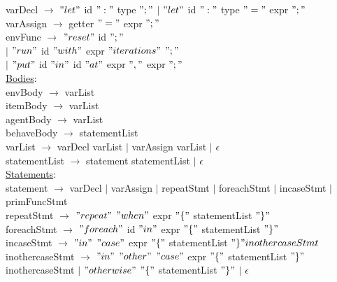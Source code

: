 \documentclass{article}
\begin{document}
varDecl $\rightarrow$ $"let"$ id $":"$ type $";"$ $\vert$ $"let"$ id $":"$ type $"="$ expr $";"$ \\

varAssign $\rightarrow$ getter $"="$ expr $";"$ \\

envFunc $\rightarrow$ $"reset"$ id $";"$ \\
$\vert$ $"run"$ id $"with"$ expr $"iterations"$ $";"$\\
$\vert$ $"put"$ id $"in"$ id $"at"$ expr $","$ expr  $";"$\\

\underline{Bodies}: \\

envBody $\rightarrow$ varList \\

itemBody $\rightarrow$ varList \\

agentBody $\rightarrow$ varList \\

behaveBody $\rightarrow$ statementList \\

varList $\rightarrow$ varDecl varList $\vert$ varAssign varList $\vert$ $\epsilon$ \\

statementList $\rightarrow$ statement statementList $\vert$ $\epsilon$ \\

\underline{Statements}: \\

statement $\rightarrow$ varDecl $\vert$ varAssign $\vert$ repeatStmt $\vert$ foreachStmt $\vert$ incaseStmt $\vert$ primFuncStmt \\

repeatStmt $\rightarrow$ $"repeat"$ $"when"$ expr $"\{"$ statementList  $"\}"$ \\

foreachStmt $\rightarrow$ $"foreach"$ id $"in"$ expr $"\{"$ statementList  $"\}"$ \\

incaseStmt $\rightarrow$  $"in"$  $"case"$ expr $"\{"$ statementList  $"\}" inothercaseStmt$\\

inothercaseStmt $\rightarrow$  $"in"$ $"other"$  $"case"$ expr $"\{"$ statementList  $"\}"$ inothercaseStmt $\vert$ $"otherwise"$ $"\{"$ statementList  $"\}"$ $\vert$ $\epsilon$ \\  
\end{document}
